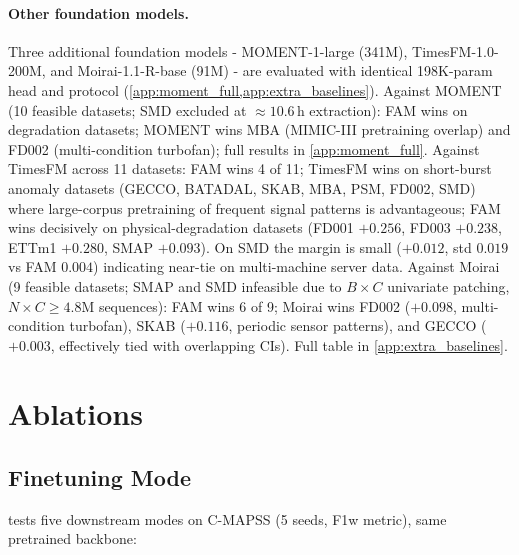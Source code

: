 \documentclass{article}
\begin{document}
\paragraph{Other foundation models.} Three additional foundation models - MOMENT-1-large (341M), TimesFM-1.0-200M, and Moirai-1.1-R-base (91M) - are evaluated with identical 198K-param head and protocol (\cref{app:moment_full,app:extra_baselines}). Against MOMENT (10 feasible datasets; SMD excluded at ${\approx}10.6$\,h extraction): FAM wins on degradation datasets; MOMENT wins MBA (MIMIC-III pretraining overlap) and FD002 (multi-condition turbofan); full results in \cref{app:moment_full}. Against TimesFM across 11 datasets: FAM wins 4 of 11; TimesFM wins on short-burst anomaly datasets (GECCO, BATADAL, SKAB, MBA, PSM, FD002, SMD) where large-corpus pretraining of frequent signal patterns is advantageous; FAM wins decisively on physical-degradation datasets (FD001 $+0.256$, FD003 $+0.238$, ETTm1 $+0.280$, SMAP $+0.093$). On SMD the margin is small ($+0.012$, std $0.019$ vs FAM $0.004$) indicating near-tie on multi-machine server data. Against Moirai (9 feasible datasets; SMAP and SMD infeasible due to $B{\times}C$ univariate patching, $N{\times}C{\geq}4.8$M sequences): FAM wins 6 of 9; Moirai wins FD002 ($+0.098$, multi-condition turbofan), SKAB ($+0.116$, periodic sensor patterns), and GECCO ($+0.003$, effectively tied with overlapping CIs). Full table in \cref{app:extra_baselines}.

\section{Ablations}
\label{sec:ablations}

\subsection{Finetuning Mode}
\label{sec:finetune_ablation}

 tests five downstream modes on C-MAPSS (5 seeds, F1w metric), same pretrained backbone:
\end{document}
